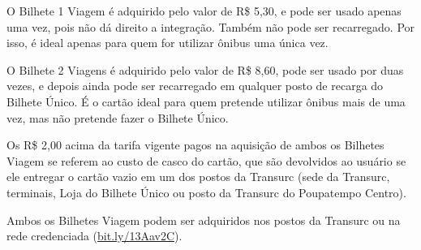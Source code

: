 O Bilhete 1 Viagem é adquirido pelo valor de R\$ 5,30, e pode ser usado apenas
uma vez, pois não dá direito a integração. Também não pode ser recarregado.  Por
isso, é ideal apenas para quem for utilizar ônibus uma única vez.

O Bilhete 2 Viagens é adquirido pelo valor de R\$ 8,60, pode ser usado por duas
vezes, e depois ainda pode ser recarregado em qualquer posto de recarga do
Bilhete Único. É o cartão ideal para quem pretende utilizar ônibus mais de uma
vez, mas não pretende fazer o Bilhete Único.

Os R\$ 2,00 acima da tarifa vigente pagos na aquisição de ambos os Bilhetes
Viagem se referem ao custo de casco do cartão, que são devolvidos ao usuário se
ele entregar o cartão vazio em um dos postos da Transurc (sede da Transurc,
terminais, Loja do Bilhete Único ou posto da Transurc do Poupatempo Centro).

Ambos os Bilhetes Viagem podem ser adquiridos nos postos da Transurc ou na rede
credenciada
(\url{bit.ly/13Aav2C}).
